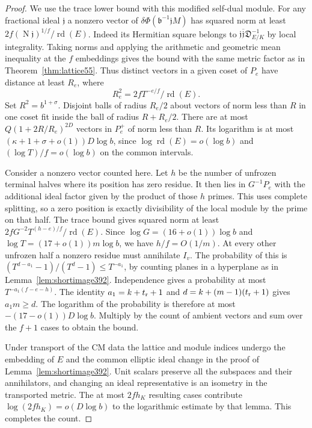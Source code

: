 \documentclass[a4paper,11pt]{article}
\theoremstyle{definition}
\theoremstyle{remark}
\numberwithin{equation}{section}
\begin{document}
\begin{proof}
We use the trace lower bound with this modified self-dual module.
For any fractional ideal \(\mathfrak j\) a nonzero vector of
\(\delta\Phi(\mathfrak b^{-1}\mathfrak j M)\) has squared norm
at least \(2f(\operatorname N\mathfrak j)^{1/f}/\operatorname{rd}(E)\).
Indeed its Hermitian square belongs to
\(\mathfrak j\overline{\mathfrak j}\mathfrak D_{E/K}^{-1}\)
by local integrality. Taking norms and applying the arithmetic
and geometric mean inequality at the \(f\) embeddings gives
the bound with the same metric factor as in
Theorem~\ref{thm:lattice55}. Thus distinct vectors in a given
coset of \(P_e\) have distance at least \(R_e\), where
\[
                R_e^2=2fT^{-e/f}/\operatorname{rd}(E).
\]
Set \(R^2=b^{1+\sigma}\). Disjoint balls of radius \(R_e/2\)
about vectors of norm less than \(R\) in one coset fit inside
the ball of radius \(R+R_e/2\). There are at most
\(Q(1+2R/R_e)^{2D}\) vectors in \(P_e^+\) of norm less than
\(R\). Its logarithm is at most
\((\kappa+1+\sigma+o(1))D\log b\), since
\(\log\operatorname{rd}(E)=o(\log b)\) and
\((\log T)/f=o(\log b)\) on the common intervals.

Consider a nonzero vector counted here. Let \(h\) be the
number of unfrozen terminal halves where its position has
zero residue. It then lies in \(G^{-1}P_e\) with the additional
ideal factor given by the product of those \(h\) primes.
This uses complete splitting, so a zero position is exactly
divisibility of the local module by the prime on that half.
The trace bound gives squared norm at least
\(2fG^{-2}T^{(h-e)/f}/\operatorname{rd}(E)\).
Since \(\log G=(16+o(1))\log b\) and
\(\log T=(17+o(1))m\log b\), we have \(h/f=O(1/m)\).
At every other unfrozen half a nonzero residue must annihilate
\(I_v\). The probability of this is
\((T^{d-a_1}-1)/(T^d-1)\le T^{-a_1}\), by counting planes
in a hyperplane as in Lemma~\ref{lem:shortimage392}.
Independence gives a probability at most \(T^{-a_1(f-e-h)}\).
The identity \(a_1=k+t_{\rm r}+1\) and
\(d=k+(m-1)(t_{\rm r}+1)\) gives \(a_1m\ge d\).
The logarithm of the probability is therefore at most
\(-(17-o(1))D\log b\). Multiply by the count of ambient vectors
and sum over the \(f+1\) cases to obtain the bound.

Under transport of the CM data the lattice and module indices
undergo the embedding of \(E\) and the common elliptic ideal
change in the proof of Lemma~\ref{lem:shortimage392}. Unit
scalars preserve all the subspaces and their annihilators,
and changing an ideal representative is an isometry in the
transported metric. The at most \(2f h_K\) resulting cases
contribute \(\log(2f h_K)=o(D\log b)\) to the logarithmic
estimate by that lemma. This completes the count.
\end{proof}
\end{document}
